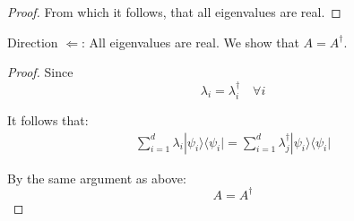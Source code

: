 \documentclass{article}
\newcommand{\bra}[1]{\langle #1|}
\newcommand{\ket}[1]{|#1\rangle}
\newcommand{\ketbra}[2]{\ket{#1}{\bra{#2}}}
\begin{document}
\begin{enumerate}
\begin{enumerate}
\begin{proof}
                  From which it follows, that all eigenvalues are real.
                \end{proof}

                Direction $\Leftarrow$: All eigenvalues are real. We show that $A=A^\dagger$.

                \begin{proof}
                  Since
                  \begin{equation}
                    \lambda_i=\lambda_i^\dagger \quad \forall i
                  \end{equation}

                  It follows that:
                  \begin{equation}
                    \begin{aligned}
                      \sum_{i=1}^d \lambda_i \ketbra{\psi_i}{\psi_i}=\sum_{i=1}^d \lambda_j^\dagger \ketbra{\psi_i}{\psi_i}
                    \end{aligned}
                  \end{equation}

                  By the same argument as above:
                  $$A=A^\dagger$$
                \end{proof}
        \end{enumerate}

\end{enumerate}
\end{document}
